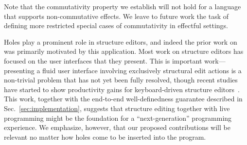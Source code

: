Note that the commutativity property we establish will not hold for a language that supports non-commutative effects. We leave to future work the task of defining more restricted special cases of commutativity in effectful settings.







Holes play a prominent role in structure editors, and indeed the prior work on \Hazelnut was primarily motivated by this application. 
Most work on structure editors has focused on the user interfaces that they
present. This is important work---presenting a fluid user interface involving
exclusively structural edit actions is a non-trivial problem that has not yet
been fully resolved, though recent studies have started to show productivity
gains for keyboard-driven structure
editors~\cite{DBLP:conf/vl/Asenov014,DBLP:conf/sle/VolterSBK14}.
This work, together with the end-to-end well-definedness guarantee described in Sec.~\ref{sec:implementation}, suggests that structure editing together with live programming might be the foundation for a ``next-generation'' programming experience. We emphasize, however, 
that our proposed contributions will be relevant no matter how holes come to be
inserted into the program. %

